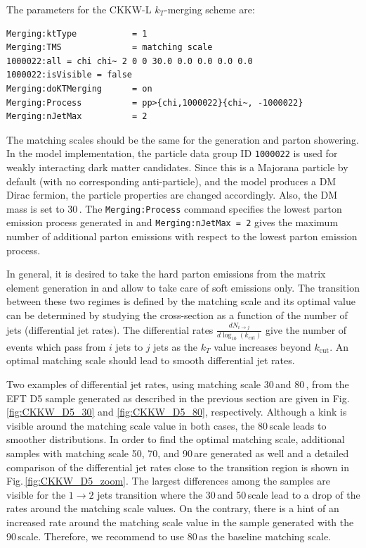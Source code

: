 The \pythiaEight parameters for the CKKW-L $k_T$-merging scheme are:
\begin{verbatim}
Merging:ktType           = 1
Merging:TMS              = matching scale
1000022:all = chi chi~ 2 0 0 30.0 0.0 0.0 0.0 0.0 
1000022:isVisible = false
Merging:doKTMerging      = on
Merging:Process          = pp>{chi,1000022}{chi~, -1000022}
Merging:nJetMax          = 2
\end{verbatim}
The matching scales should be the same for the generation and parton showering.
In the model implementation, the particle data group ID \texttt{1000022} is used for weakly
interacting dark matter candidates.   Since this is a Majorana particle by default (with no
corresponding anti-particle), and the model produces a DM Dirac fermion, the particle properties
are changed accordingly.  Also, the DM mass is set to 30\,\gev.
The \texttt{Merging:Process} command specifies the lowest parton emission process generated in \madgraph and \texttt{Merging:nJetMax = 2} gives the maximum number of additional parton emissions with respect to the lowest parton emission process. 

 In general, it is desired to take the hard parton emissions from the matrix element generation in \madgraph and allow \pythiaEight to take care of soft emissions only. The transition between these two regimes is defined by the matching scale and its optimal value can be determined by studying the cross-section as a function of the number of jets (differential jet rates). The differential rates $\frac{dN_{i\to j}}{d \log_{10}(k_\textrm{cut})}$ give the number of events which pass from $i$ jets to $j$ jets as the $k_T$ value increases beyond $k_\textrm{cut}$. An optimal matching scale should lead to smooth differential jet rates.

 Two examples of differential jet rates, using matching scale 30\,\gev and 80\,\gev, from the EFT D5 sample generated as described in the previous section are given in Fig.\,\ref{fig:CKKW_D5_30} and \ref{fig:CKKW_D5_80}, respectively.
 Although a kink is visible around the matching scale value in both cases, the 80\,\gev scale leads to smoother distributions. 
 In order to find the optimal matching scale, additional samples with matching scale 50, 70, and 90\,\gev are generated as well and a detailed comparison of the differential jet rates close to the transition region is shown in Fig.\,\ref{fig:CKKW_D5_zoom}.
 The largest differences among the samples are visible for the $1\rightarrow2$ jets transition where the 30\,\gev and 50\,\gev scale lead to a drop of the rates around the matching scale values. On the contrary, there is a hint of an increased rate around the matching scale value in the sample generated with the 90\,\gev scale. Therefore, we recommend to use 80\,\gev as the baseline matching scale.


